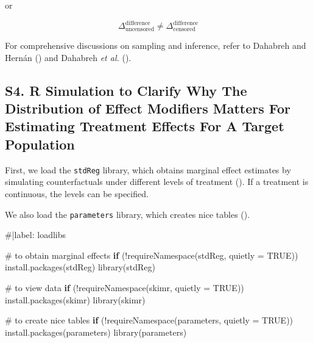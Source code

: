 \documentclass[
  single column]{article}
\newenvironment{Shaded}{\begin{snugshade}}{\end{snugshade}}
\newcommand{\AttributeTok}[1]{\textcolor[rgb]{0.40,0.45,0.13}{#1}}
\newcommand{\CommentTok}[1]{\textcolor[rgb]{0.37,0.37,0.37}{#1}}
\newcommand{\ConstantTok}[1]{\textcolor[rgb]{0.56,0.35,0.01}{#1}}
\newcommand{\ControlFlowTok}[1]{\textcolor[rgb]{0.00,0.23,0.31}{\textbf{#1}}}
\newcommand{\FunctionTok}[1]{\textcolor[rgb]{0.28,0.35,0.67}{#1}}
\newcommand{\NormalTok}[1]{\textcolor[rgb]{0.00,0.23,0.31}{#1}}
\newcommand{\SpecialCharTok}[1]{\textcolor[rgb]{0.37,0.37,0.37}{#1}}
\newcommand{\StringTok}[1]{\textcolor[rgb]{0.13,0.47,0.30}{#1}}
\begin{document}
or

\[ \Delta^{\text{difference}}_{\text{uncensored}} \ne \Delta^{\text{difference}}_{\text{censored}} \]

For comprehensive discussions on sampling and inference, refer to
Dahabreh and Hernán () and Dahabreh
\emph{et al.} ().

\newpage{}

\subsection{S4. R Simulation to Clarify Why The Distribution of Effect
Modifiers Matters For Estimating Treatment Effects For A Target
Population}\label{id-app-d}

First, we load the \texttt{stdReg} library, which obtains marginal
effect estimates by simulating counterfactuals under different levels of
treatment (). If a
treatment is continuous, the levels can be specified.

We also load the \texttt{parameters} library, which creates nice tables
().

\begin{Shaded}
\begin{Highlighting}[]
\CommentTok{\#|label: loadlibs}

\CommentTok{\# to obtain marginal effects}
\ControlFlowTok{if}\NormalTok{ (}\SpecialCharTok{!}\FunctionTok{requireNamespace}\NormalTok{(}\StringTok{\textquotesingle{}stdReg\textquotesingle{}}\NormalTok{, }\AttributeTok{quietly =} \ConstantTok{TRUE}\NormalTok{)) }\FunctionTok{install.packages}\NormalTok{(}\StringTok{\textquotesingle{}stdReg\textquotesingle{}}\NormalTok{)}
\FunctionTok{library}\NormalTok{(stdReg)}

\CommentTok{\#  to view data}
\ControlFlowTok{if}\NormalTok{ (}\SpecialCharTok{!}\FunctionTok{requireNamespace}\NormalTok{(}\StringTok{\textquotesingle{}skimr\textquotesingle{}}\NormalTok{, }\AttributeTok{quietly =} \ConstantTok{TRUE}\NormalTok{)) }\FunctionTok{install.packages}\NormalTok{(}\StringTok{\textquotesingle{}skimr\textquotesingle{}}\NormalTok{)}
\FunctionTok{library}\NormalTok{(skimr)}

\CommentTok{\# to create nice tables}
\ControlFlowTok{if}\NormalTok{ (}\SpecialCharTok{!}\FunctionTok{requireNamespace}\NormalTok{(}\StringTok{\textquotesingle{}parameters\textquotesingle{}}\NormalTok{, }\AttributeTok{quietly =} \ConstantTok{TRUE}\NormalTok{)) }\FunctionTok{install.packages}\NormalTok{(}\StringTok{\textquotesingle{}parameters\textquotesingle{}}\NormalTok{)}
\FunctionTok{library}\NormalTok{(parameters)}
\end{Highlighting}
\end{Shaded}
\end{document}
